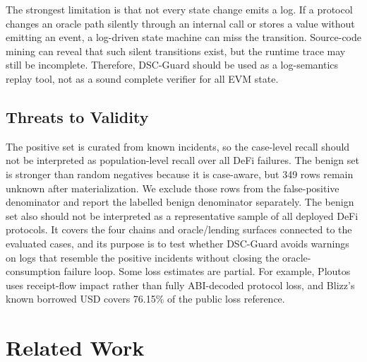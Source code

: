 \documentclass[final,5p]{elsarticle}
\newcommand{\tool}{DSC-Guard\xspace}
\begin{document}
The strongest limitation is that not every state change emits a log.
If a protocol changes an oracle path silently through an internal call or stores a value without emitting an event, a log-driven state machine can miss the transition.
Source-code mining can reveal that such silent transitions exist, but the runtime trace may still be incomplete.
Therefore, \tool should be used as a log-semantics replay tool, not as a sound complete verifier for all EVM state.

\subsection{Threats to Validity}

The positive set is curated from known incidents, so the case-level recall should not be interpreted as population-level recall over all DeFi failures.
The benign set is stronger than random negatives because it is case-aware, but 349 rows remain unknown after materialization.
We exclude those rows from the false-positive denominator and report the labelled benign denominator separately.
The benign set also should not be interpreted as a representative sample of all deployed DeFi protocols.
It covers the four chains and oracle/lending surfaces connected to the evaluated cases, and its purpose is to test whether \tool avoids warnings on logs that resemble the positive incidents without closing the oracle-consumption failure loop.
Some loss estimates are partial.
For example, Ploutos uses receipt-flow impact rather than fully ABI-decoded protocol loss, and Blizz's known borrowed USD covers 76.15\% of the public loss reference.

\section{Related Work}
\label{sec:related}
\end{document}
